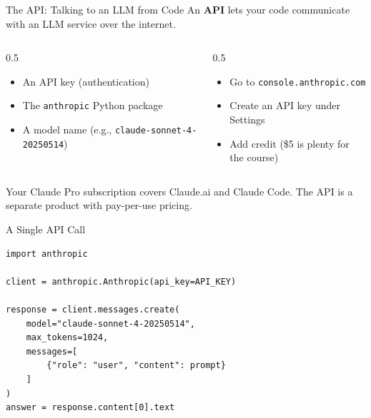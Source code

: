 \documentclass[aspectratio=169]{beamer}
\begin{document}
\begin{frame}{The API: Talking to an LLM from Code}
An \textbf{API} lets your code communicate with an LLM service over the internet.
\vspace{0.3cm}
\begin{columns}[T]
\begin{column}{0.5\textwidth}
\begin{shadedbox}[title=\textbf{What You Need}]
\begin{itemize}\small
  \item An API key (authentication)
  \item The \texttt{anthropic} Python package
  \item A model name (e.g., \texttt{claude-sonnet-4-20250514})
\end{itemize}
\end{shadedbox}
\end{column}
\begin{column}{0.5\textwidth}
\begin{shadedbox}[title=\textbf{Getting Your Key}]
\begin{itemize}\small
  \item Go to \texttt{console.anthropic.com}
  \item Create an API key under Settings
  \item Add credit (\$5 is plenty for the course)
\end{itemize}
\end{shadedbox}
\end{column}
\end{columns}
\vspace{0.3cm}
Your Claude Pro subscription covers Claude.ai and Claude Code.  The API is a separate product with pay-per-use pricing.
\end{frame}

\begin{frame}[fragile]{A Single API Call}
\begin{shadedbox}[title=\textbf{Calling the Anthropic API}]
\begin{verbatim}
import anthropic

client = anthropic.Anthropic(api_key=API_KEY)

response = client.messages.create(
    model="claude-sonnet-4-20250514",
    max_tokens=1024,
    messages=[
        {"role": "user", "content": prompt}
    ]
)
answer = response.content[0].text
\end{verbatim}
\end{shadedbox}
\end{frame}
\end{document}
